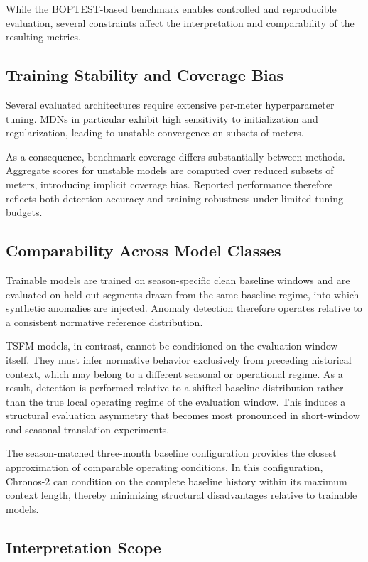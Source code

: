 While the BOPTEST-based benchmark enables controlled and reproducible evaluation,
several constraints affect the interpretation and comparability of the resulting
metrics.

\subsection{Training Stability and Coverage Bias}

Several evaluated architectures require extensive per-meter hyperparameter tuning.
\ac{MDN}s in particular exhibit high sensitivity to initialization
and regularization, leading to unstable convergence on subsets of meters.

As a consequence, benchmark coverage differs substantially between methods. Aggregate
scores for unstable models are computed over reduced subsets of meters, introducing
implicit coverage bias. Reported performance therefore reflects both detection accuracy
and training robustness under limited tuning budgets.

\subsection{Comparability Across Model Classes}

Trainable models are trained on season-specific clean baseline windows and are
evaluated on held-out segments drawn from the same baseline regime, into which
synthetic anomalies are injected. Anomaly detection therefore operates relative to a
consistent normative reference distribution.

\ac{TSFM} models, in contrast, cannot be conditioned on the evaluation window
itself. They must infer normative behavior exclusively from preceding historical
context, which may belong to a different seasonal or operational regime. As a result,
detection is performed relative to a shifted baseline distribution rather than the true
local operating regime of the evaluation window. This induces a structural evaluation
asymmetry that becomes most pronounced in short-window and seasonal translation
experiments.

The season-matched three-month baseline configuration provides the closest
approximation of comparable operating conditions. In this configuration, Chronos-2
can condition on the complete baseline history within its maximum context length,
thereby minimizing structural disadvantages relative to trainable models.


\subsection{Interpretation Scope}

